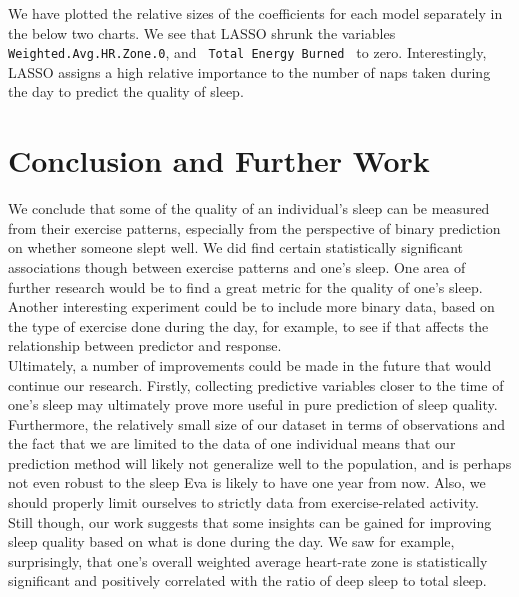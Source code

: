 \documentclass{article}
\begin{document}
We have plotted the relative sizes of the coefficients for each model separately in the below two charts. We see that LASSO shrunk the variables \texttt{Weighted.Avg.HR.Zone.0}, and \texttt{ Total Energy Burned } to zero. Interestingly, LASSO assigns a high relative importance to the number of naps taken during the day to predict the quality of sleep.

\section{\hspace{0.5em} Conclusion and Further Work}

We conclude that some of the quality of an individual's sleep can be measured from their exercise patterns, especially from the perspective of binary prediction on whether someone slept well. We did find certain statistically significant associations though between exercise patterns and one's sleep. One area of further research would be to find a great metric for the quality of one's sleep. Another interesting experiment could be to include more binary data, based on the type of exercise done during the day, for example, to see if that affects the relationship between predictor and response. \\

Ultimately, a number of improvements could be made in the future that would continue our research. Firstly, collecting predictive variables closer to the time of one's sleep may ultimately prove more useful in pure prediction of sleep quality. Furthermore, the relatively small size of our dataset in terms of observations and the fact that we are limited to the data of one individual means that our prediction method will likely not generalize well to the population, and is perhaps not even robust to the sleep Eva is likely to have one year from now. Also, we should properly limit ourselves to strictly data from exercise-related activity.\\

Still though, our work suggests that some insights can be gained for improving sleep quality based on what is done during the day. We saw for example, surprisingly, that one's overall weighted average heart-rate zone is statistically significant and positively correlated with the ratio of deep sleep to total sleep. \\
\newpage

  

\end{document}
